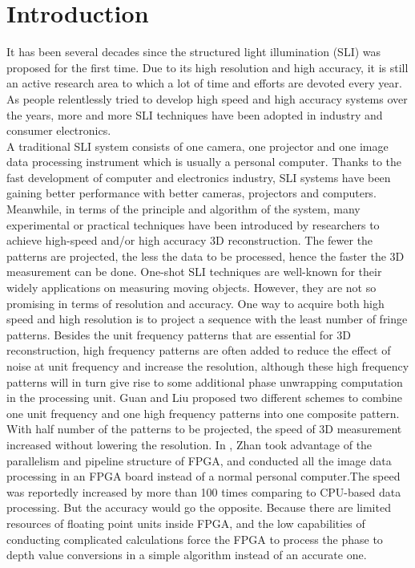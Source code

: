 \documentclass[10pt,letterpaper]{article}
\begin{document}
\section{Introduction}
It has been several decades since the structured light illumination (SLI) was proposed for the first time. Due to its high resolution and high accuracy, it is still an active research area to which a lot of time and efforts are devoted every year. As people relentlessly tried to develop high speed and high accuracy systems over the years, more and more SLI techniques have been adopted in industry and consumer electronics.\\
A traditional SLI system consists of one camera, one projector and one image data processing instrument which is usually a personal computer. Thanks to the fast development of computer and electronics industry, SLI systems have been gaining better performance with better cameras, projectors and computers. Meanwhile, in terms of the principle and algorithm of the system, many experimental or practical techniques have been introduced by researchers to achieve high-speed and/or high accuracy 3D reconstruction. The fewer the patterns are projected, the less the data to be processed, hence the faster the 3D measurement can be done. One-shot SLI techniques are well-known for their widely applications on measuring moving objects. However, they are not so promising in terms of resolution and accuracy. One way to acquire both high speed and high resolution is to project a sequence with the least number of fringe patterns. Besides the unit frequency patterns that are essential for 3D reconstruction,  high frequency patterns are often added to reduce the effect of noise at unit frequency and increase the resolution, although these high frequency patterns will in turn give rise to some additional phase unwrapping computation in the processing unit. Guan \cite{guan03} and Liu \cite{kai10}proposed two different schemes to combine one unit frequency and one high frequency patterns into one composite pattern. With half number of the patterns to be projected, the speed of 3D measurement increased without lowering the resolution. In \cite{Zhan17}, Zhan took advantage of the parallelism and pipeline structure of FPGA, and conducted all the image data processing in an FPGA board instead of a normal personal computer.The speed was reportedly increased by more than 100 times comparing to CPU-based data processing. But the accuracy would go the opposite. Because there are limited resources of floating point units inside FPGA,  and the low capabilities of conducting complicated calculations force the FPGA to process the phase to depth value conversions in a simple algorithm instead of an accurate one.
\end{document}
